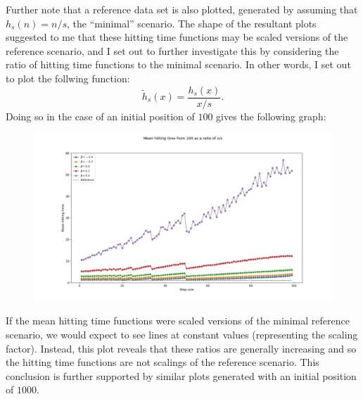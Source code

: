 Further note that a reference data set is also plotted, generated by assuming that $h_s(n) = n/s$, the
``minimal'' scenario. The shape of the resultant plots suggested to me that these hitting time functions
may be scaled versions of the reference scenario, and I set out to further investigate this by
considering the ratio of hitting time functions to the minimal scenario. In other words, I set out to
plot the follwing function:
\[
    \tilde{h}_s(x) = \frac{h_s(x)}{x/s}.  
\]
Doing so in the case of an initial position of $100$ gives the following graph:

\noindent
\begin{figure}[H]
    \includegraphics[width=\textwidth]{plots/hittingtimesplot2.jpg}
    \centering
\end{figure}

If the mean hitting time functions were scaled versions of the minimal reference scenario, we would
expect to see lines at constant values (representing the scaling factor). Instead, this plot reveals
that these ratios are generally increasing and so the hitting time functions are not scalings of the
reference scenario. This conclusion is further supported by similar plots generated with an initial
position of $1000$.

